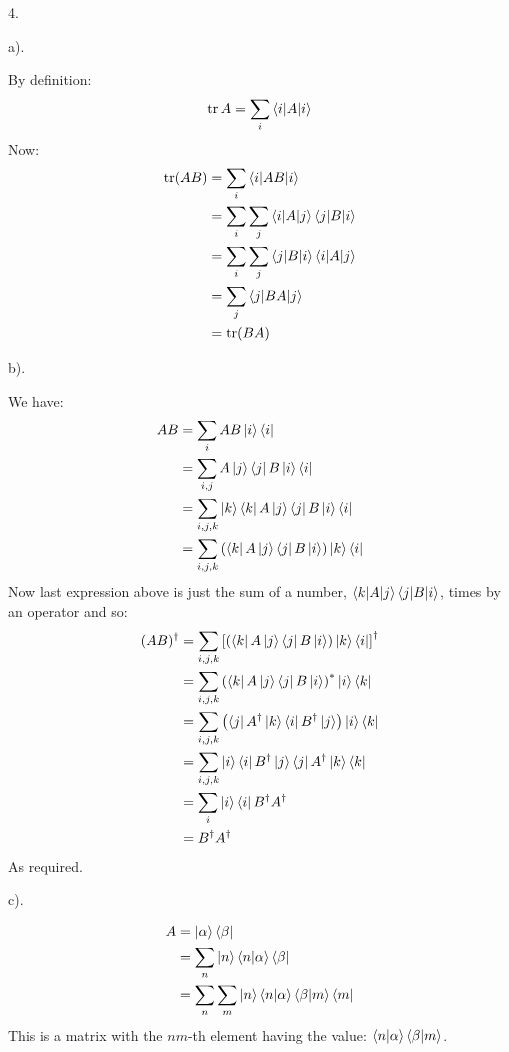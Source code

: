 \documentclass[a4paper,12pt]{article}
\begin{document}
4.
\begin{minipage}[t]{0.9\textwidth}
  a).
  \begin{minipage}[t]{\textwidth}
    By definition:
    \begin{equation*}
      \trace{A} = \sum_i \braket{i|A|i}
    \end{equation*}
    Now:
    \begin{align*}
      \trace(AB) &= \sum_i \braket{i|AB|i}\\
                 &= \sum_i\sum_j \braket{i|A|j}\braket{j|B|i}\\
                 &= \sum_i\sum_j \braket{j|B|i}\braket{i|A|j}\\
                 &= \sum_j \braket{j|BA|j}\\
                 &= \trace(BA)
    \end{align*}
  \end{minipage}

  b).
  \begin{minipage}[t]{\textwidth}
    We have:
    \begin{align*}
      AB &= \sum_{i} AB\ket{i}\bra{i}\\
         &= \sum_{i, j}A\ket{j} \bra{j}B\ket{i}\bra{i}\\
         &= \sum_{i, j, k}\ket{k} \bra{k}A\ket{j} \bra{j}B\ket{i}\bra{i}\\
         &= \sum_{i, j, k}\left( \bra{k}A\ket{j} \bra{j}B\ket{i} \right) \ket{k}\bra{i}
    \end{align*}
    Now last expression above is just the sum of a number, $\braket{k|A|j}\braket{j|B|i}$, times by an operator and so:
    \begin{align*}
      (AB)^\dagger &= \sum_{i, j, k} \left[\left(\bra{k}A\ket{j} \bra{j}B\ket{i} \right)\ket{k}\bra{i}\right]^\dagger\\
                   &= \sum_{i, j, k} \left(\bra{k}A\ket{j} \bra{j}B\ket{i}\right)^* \ket{i}\bra{k}\\
                   &= \sum_{i, j, k}\left( \bra{j}A^\dagger\ket{k} \bra{i}B^\dagger\ket{j}\right) \ket{i}\bra{k}\\
                   &= \sum_{i, j, k} \ket{i}\bra{i}B^\dagger\ket{j}\bra{j}A^\dagger\ket{k}\bra{k}\\
                   &= \sum_{i}\ket{i}\bra{i}B^\dagger A^\dagger\\
                   &= B^\dagger A^\dagger
    \end{align*}
    As required.
  \end{minipage}

  c).
  \begin{minipage}[t]{\textwidth}
    \begin{align*}
      A &= \ket{\alpha}\bra{\beta}\\
        &= \sum_n\ket{n}\braket{n|\alpha}\bra{\beta}\\
        &= \sum_n\sum_m\ket{n}\braket{n|\alpha}\braket{\beta|m}\bra{m}
    \end{align*}
    This is a matrix with the $nm$-th element having the value: $\braket{n|\alpha}\braket{\beta|m}$.
  \end{minipage}
\end{minipage}
\end{document}

